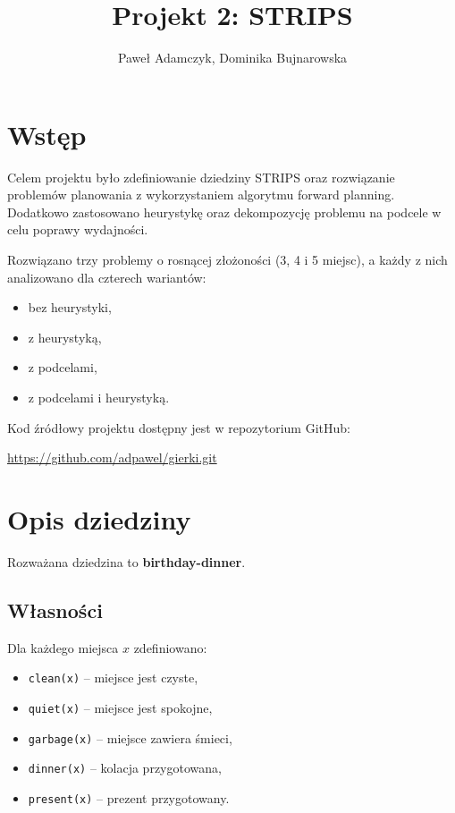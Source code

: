 \documentclass[a4paper,12pt]{article}
\title{Projekt 2: STRIPS}
\author{Paweł Adamczyk, Dominika Bujnarowska}
\date{}
\begin{document}
\maketitle

\section{Wstęp}

Celem projektu było zdefiniowanie dziedziny STRIPS oraz rozwiązanie problemów planowania z wykorzystaniem algorytmu forward planning. Dodatkowo zastosowano heurystykę oraz dekompozycję problemu na podcele w celu poprawy wydajności.

Rozwiązano trzy problemy o rosnącej złożoności (3, 4 i 5 miejsc), a każdy z nich analizowano dla czterech wariantów:
\begin{itemize}
    \item bez heurystyki,
    \item z heurystyką,
    \item z podcelami,
    \item z podcelami i heurystyką.
\end{itemize}

Kod źródłowy projektu dostępny jest w repozytorium GitHub:

\url{https://github.com/adpawel/gierki.git}

\section{Opis dziedziny}

Rozważana dziedzina to \textbf{birthday-dinner}.

\subsection{Własności}

Dla każdego miejsca $x$ zdefiniowano:
\begin{itemize}
    \item \texttt{clean(x)} -- miejsce jest czyste,
    \item \texttt{quiet(x)} -- miejsce jest spokojne,
    \item \texttt{garbage(x)} -- miejsce zawiera śmieci,
    \item \texttt{dinner(x)} -- kolacja przygotowana,
    \item \texttt{present(x)} -- prezent przygotowany.
\end{itemize}
\end{document}
